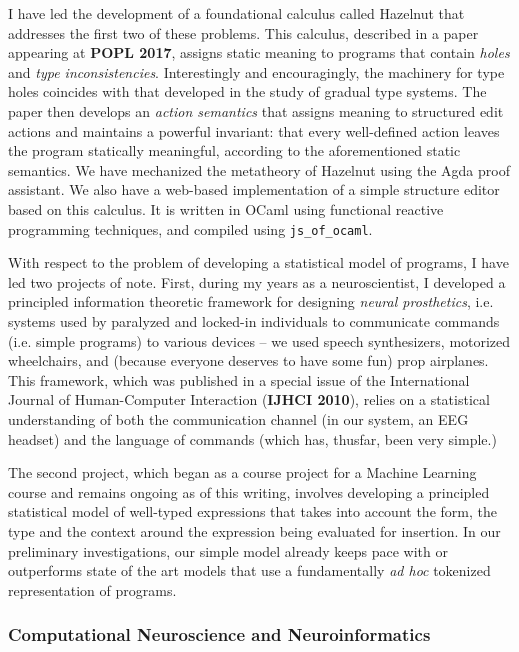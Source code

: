 \documentclass[10pt]{article}
\let\li\lstinline
\begin{document}
I have led the development of a foundational calculus called Hazelnut that addresses the first two of these problems. This calculus, described in a paper appearing at \textbf{POPL 2017}, assigns static meaning to programs that contain \emph{holes} and \emph{type inconsistencies}. Interestingly and encouragingly, the machinery for type holes coincides with that developed in the study of gradual type systems. The paper then develops an \emph{action semantics} that assigns meaning to structured edit actions and maintains a powerful invariant: that every well-defined action leaves the program statically meaningful, according to the aforementioned static semantics. We have mechanized the metatheory of Hazelnut using the Agda proof assistant. We also have a web-based implementation of a simple {structure editor} based on this calculus. It is written in OCaml using functional reactive programming techniques, and compiled using \li{js_of_ocaml}.

With respect to the problem of developing a statistical model of programs, I have led two projects of note. 
First, during my years as a neuroscientist, I developed a principled information theoretic framework for designing \emph{neural prosthetics}, i.e. systems used by paralyzed and locked-in individuals to communicate commands (i.e. simple programs) to various devices -- we used speech synthesizers, motorized wheelchairs, and (because everyone deserves to have some fun) prop airplanes. This framework, which was published in a special issue of the {International Journal of Human-Computer Interaction} (\textbf{IJHCI 2010}), relies on a statistical understanding of both the communication channel (in our system, an EEG headset) and  the language of commands (which has, thusfar, been very simple.)

The second project, which began as a course project for a Machine Learning course and remains ongoing as of this writing, involves developing a principled statistical model of well-typed expressions that takes into account the form, the type and the context around the expression being evaluated for insertion. In our preliminary investigations, our simple model already keeps pace with or outperforms state of the art models that use a fundamentally \emph{ad hoc} tokenized representation of programs. %



\subsubsection*{Computational Neuroscience and Neuroinformatics}
\end{document}
